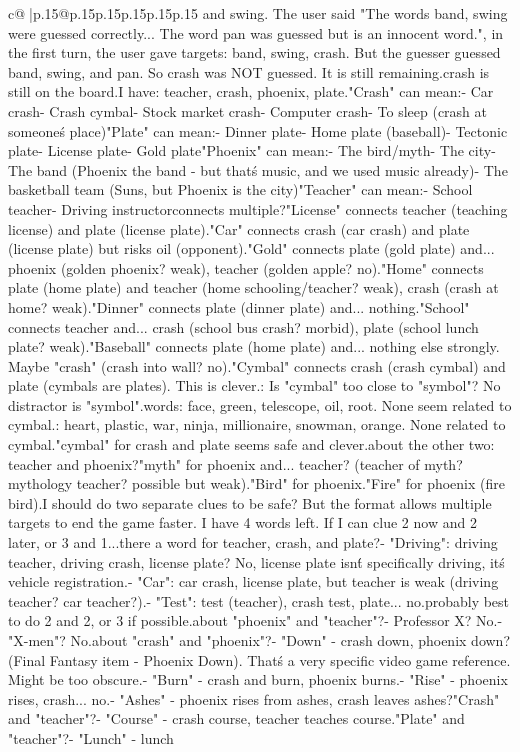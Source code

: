 \documentclass{article}
\begin{document}
{\begin{supertabular}{c@{$\;$}|p{.15\linewidth}@{}p{.15\linewidth}p{.15\linewidth}p{.15\linewidth}p{.15\linewidth}p{.15\linewidth}}
{{{and swing. The user said "The words band, swing were guessed correctly... The word pan was guessed but is an innocent word."\nWait, in the first turn, the user gave targets: band, swing, crash. But the guesser guessed band, swing, and pan. So crash was NOT guessed. It is still remaining.\n\nSo crash is still on the board.\n\nSo I have: teacher, crash, phoenix, plate.\n\n"Crash" can mean:\n- Car crash\n- Crash cymbal\n- Stock market crash\n- Computer crash\n- To sleep (crash at someone\'s place)\n\n"Plate" can mean:\n- Dinner plate\n- Home plate (baseball)\n- Tectonic plate\n- License plate\n- Gold plate\n\n"Phoenix" can mean:\n- The bird/myth\n- The city\n- The band (Phoenix the band - but that\'s music, and we used music already)\n- The basketball team (Suns, but Phoenix is the city)\n\n"Teacher" can mean:\n- School teacher\n- Driving instructor\n\nWhat connects multiple?\n\n"License" connects teacher (teaching license) and plate (license plate).\n"Car" connects crash (car crash) and plate (license plate) but risks oil (opponent).\n"Gold" connects plate (gold plate) and... phoenix (golden phoenix? weak), teacher (golden apple? no).\n"Home" connects plate (home plate) and teacher (home schooling/teacher? weak), crash (crash at home? weak).\n"Dinner" connects plate (dinner plate) and... nothing.\n"School" connects teacher and... crash (school bus crash? morbid), plate (school lunch plate? weak).\n"Baseball" connects plate (home plate) and... nothing else strongly. Maybe "crash" (crash into wall? no).\n\n"Cymbal" connects crash (crash cymbal) and plate (cymbals are plates). This is clever.\nRisk: Is "cymbal" too close to "symbol"? No distractor is "symbol".\nOpponent words: face, green, telescope, oil, root. None seem related to cymbal.\nDistractors: heart, plastic, war, ninja, millionaire, snowman, orange. None related to cymbal.\nSo "cymbal" for crash and plate seems safe and clever.\n\nWhat about the other two: teacher and phoenix?\nMaybe "myth" for phoenix and... teacher? (teacher of myth? mythology teacher? possible but weak).\n"Bird" for phoenix.\n"Fire" for phoenix (fire bird).\n\nMaybe I should do two separate clues to be safe? But the format allows multiple targets to end the game faster. I have 4 words left. If I can clue 2 now and 2 later, or 3 and 1...\n\nIs there a word for teacher, crash, and plate?\n- "Driving": driving teacher, driving crash, license plate? No, license plate isn\'t specifically driving, it\'s vehicle registration.\n- "Car": car crash, license plate, but teacher is weak (driving teacher? car teacher?).\n- "Test": test (teacher), crash test, plate... no.\n\nSo probably best to do 2 and 2, or 3 if possible.\n\nWhat about "phoenix" and "teacher"?\n- Professor X? No.\n- "X-men"? No.\n\nWhat about "crash" and "phoenix"?\n- "Down" - crash down, phoenix down? (Final Fantasy item - Phoenix Down). That\'s a very specific video game reference. Might be too obscure.\n- "Burn" - crash and burn, phoenix burns.\n- "Rise" - phoenix rises, crash... no.\n- "Ashes" - phoenix rises from ashes, crash leaves ashes?\n\n"Crash" and "teacher"?\n- "Course" - crash course, teacher teaches course.\n"Plate" and "teacher"?\n- "Lunch" - lunch }}}
\end{supertabular}}
\end{document}
